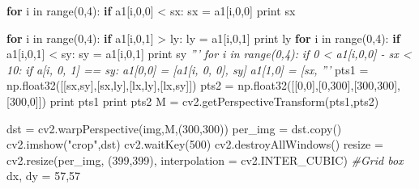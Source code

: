 \documentclass[]{article}
\newenvironment{Shaded}{}{}
\newcommand{\DecValTok}[1]{\textcolor[rgb]{0.25,0.63,0.44}{{#1}}}
\newcommand{\StringTok}[1]{\textcolor[rgb]{0.25,0.44,0.63}{{#1}}}
\newcommand{\CommentTok}[1]{\textcolor[rgb]{0.38,0.63,0.69}{\textit{{#1}}}}
\newcommand{\ControlFlowTok}[1]{\textcolor[rgb]{0.00,0.44,0.13}{\textbf{{#1}}}}
\newcommand{\OperatorTok}[1]{\textcolor[rgb]{0.40,0.40,0.40}{{#1}}}
\newcommand{\BuiltInTok}[1]{{#1}}
\newcommand{\NormalTok}[1]{{#1}}
\begin{document}
\begin{Shaded}
\begin{Highlighting}[]
    \ControlFlowTok{for} \NormalTok{i }\OperatorTok{in} \BuiltInTok{range}\NormalTok{(}\DecValTok{0}\NormalTok{,}\DecValTok{4}\NormalTok{):}
        \ControlFlowTok{if} \NormalTok{a1[i,}\DecValTok{0}\NormalTok{,}\DecValTok{0}\NormalTok{] }\OperatorTok{<} \NormalTok{sx:}
            \NormalTok{sx }\OperatorTok{=} \NormalTok{a1[i,}\DecValTok{0}\NormalTok{,}\DecValTok{0}\NormalTok{]}
    \BuiltInTok{print} \NormalTok{sx }

    \ControlFlowTok{for} \NormalTok{i }\OperatorTok{in} \BuiltInTok{range}\NormalTok{(}\DecValTok{0}\NormalTok{,}\DecValTok{4}\NormalTok{):}
        \ControlFlowTok{if} \NormalTok{a1[i,}\DecValTok{0}\NormalTok{,}\DecValTok{1}\NormalTok{] }\OperatorTok{>} \NormalTok{ly:}
            \NormalTok{ly }\OperatorTok{=} \NormalTok{a1[i,}\DecValTok{0}\NormalTok{,}\DecValTok{1}\NormalTok{]}
    \BuiltInTok{print} \NormalTok{ly}
    \ControlFlowTok{for} \NormalTok{i }\OperatorTok{in} \BuiltInTok{range}\NormalTok{(}\DecValTok{0}\NormalTok{,}\DecValTok{4}\NormalTok{):}
        \ControlFlowTok{if} \NormalTok{a1[i,}\DecValTok{0}\NormalTok{,}\DecValTok{1}\NormalTok{] }\OperatorTok{<} \NormalTok{sy:}
            \NormalTok{sy }\OperatorTok{=} \NormalTok{a1[i,}\DecValTok{0}\NormalTok{,}\DecValTok{1}\NormalTok{]}
    \BuiltInTok{print} \NormalTok{sy}
    \CommentTok{'''}
\CommentTok{    for i in range(0,4):}
\CommentTok{        if 0 < a1[i,0,0] - sx < 10:}
\CommentTok{            if a[i, 0, 1] == sy:}
\CommentTok{                a1[0,0] = [a1[i, 0, 0], sy]}
\CommentTok{                a1[1,0] = [sx,}
\CommentTok{    '''}
    \NormalTok{pts1 }\OperatorTok{=} \NormalTok{np.float32([[sx,sy],[sx,ly],[lx,ly],[lx,sy]])}
    \NormalTok{pts2 }\OperatorTok{=} \NormalTok{np.float32([[}\DecValTok{0}\NormalTok{,}\DecValTok{0}\NormalTok{],[}\DecValTok{0}\NormalTok{,}\DecValTok{300}\NormalTok{],[}\DecValTok{300}\NormalTok{,}\DecValTok{300}\NormalTok{],[}\DecValTok{300}\NormalTok{,}\DecValTok{0}\NormalTok{]])}
    \BuiltInTok{print} \NormalTok{pts1}
    \BuiltInTok{print} \NormalTok{pts2}
    \NormalTok{M }\OperatorTok{=} \NormalTok{cv2.getPerspectiveTransform(pts1,pts2)}

    \NormalTok{dst }\OperatorTok{=} \NormalTok{cv2.warpPerspective(img,M,(}\DecValTok{300}\NormalTok{,}\DecValTok{300}\NormalTok{))}
    \NormalTok{per_img }\OperatorTok{=} \NormalTok{dst.copy()}
    \NormalTok{cv2.imshow(}\StringTok{"crop"}\NormalTok{,dst)}
    \NormalTok{cv2.waitKey(}\DecValTok{500}\NormalTok{)}
    \NormalTok{cv2.destroyAllWindows()}
    \NormalTok{resize }\OperatorTok{=} \NormalTok{cv2.resize(per_img, (}\DecValTok{399}\NormalTok{,}\DecValTok{399}\NormalTok{), interpolation }\OperatorTok{=} \NormalTok{cv2.INTER_CUBIC)}
    \CommentTok{#Grid box}
    \NormalTok{dx, dy }\OperatorTok{=} \DecValTok{57}\NormalTok{,}\DecValTok{57}


\end{Highlighting}
\end{Shaded}
\end{document}
